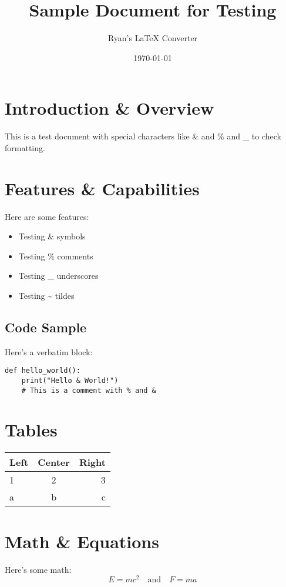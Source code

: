 \documentclass{article}
\title{Sample Document for Testing}
\author{Ryan's LaTeX Converter}
\date{\today}
\begin{document}
\maketitle

\section{Introduction \& Overview}
This is a test document with special characters like \& and \% and \_ to check formatting.

\section{Features \& Capabilities}
Here are some features:
\begin{itemize}
    \item Testing \& symbols
    \item Testing \% comments
    \item Testing \_ underscores
    \item Testing \textasciitilde{} tildes
\end{itemize}

\subsection{Code Sample}
Here's a verbatim block:
\begin{verbatim}
def hello_world():
    print("Hello & World!")
    # This is a comment with % and &
\end{verbatim}

\section{Tables}
\begin{tabular}{|l|c|r|}
    \hline
    Left & Center & Right \\
    \hline
    1 & 2 & 3 \\
    a & b & c \\
    \hline
\end{tabular}

\section{Math \& Equations}
Here's some math:
\begin{equation*}
    E = mc^{2} \quad \text{and} \quad F = ma
\end{equation*}
\end{document}
